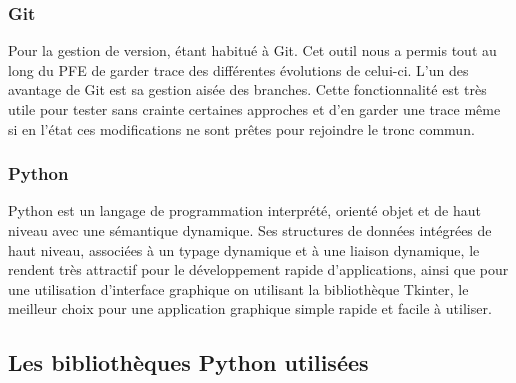 \documentclass[a4paper]{report}
\begin{document}
\subsubsection{Git}
Pour la gestion de version, étant habitué à Git. Cet outil nous a permis tout au long du PFE de garder trace des différentes évolutions de celui-ci. L’un des avantage de Git est sa gestion aisée des branches. Cette fonctionnalité est très utile pour tester sans crainte certaines approches et d’en garder une trace même si en l’état ces modifications ne sont prêtes pour rejoindre le tronc commun.
\subsubsection{Python}
Python est un langage de programmation interprété, orienté objet et de haut niveau avec une sémantique dynamique. Ses structures de données intégrées de haut niveau, associées à un typage dynamique et à une liaison dynamique, le rendent très attractif pour le développement rapide d'applications, ainsi que pour une utilisation d'interface graphique on utilisant la bibliothèque Tkinter, le meilleur choix pour une application graphique simple rapide et facile à utiliser.\newpage
\subsection{Les bibliothèques Python utilisées}
\end{document}
